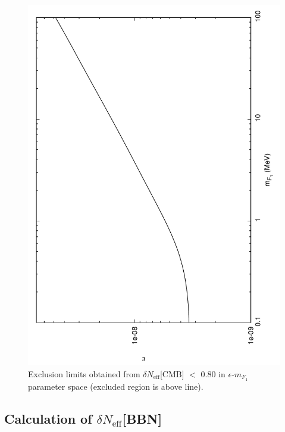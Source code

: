 \documentclass[12pt]{article}
\begin{document}
\begin{figure}[htpb]
\vskip -1.2cm
    \centering
        \includegraphics[scale=0.5, angle=270]{fig3}
    \caption{Exclusion limits obtained from $\delta N
_{\text{eff}}$[CMB] $<$ 0.80 in $\epsilon$-$m_{F_1}$ parameter space
(excluded region is above line).}
    \label{fig:Exclusion cmb}
\end{figure}
%
%
\vskip 3cm
\subsection{Calculation of $\delta N _{\text{eff}}$[BBN]}
\end{document}

